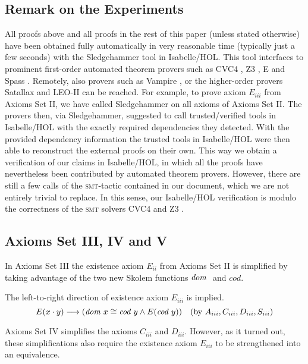 \subsection{Remark on the Experiments}
All proofs above and all proofs in the rest of this paper (unless
stated otherwise) have been obtained fully automatically in very
reasonable time (typically just a few seconds) with the
Sledgehammer tool in Isabelle/HOL. This tool interfaces to prominent
first-order automated theorem provers such as CVC4 \cite{CVC4}, Z3
\cite{Z3}, E \cite{E} and Spass \cite{Spass}.  Remotely, also
  provers such as Vampire \cite{Vampire}, or the higher-order provers
  Satallax \cite{Satallax} and LEO-II \cite{LEO} can be reached. For
  example, to prove axiom $E_{iii}$ from Axioms Set II, we have called
  Sledgehammer on all axioms of Axioms Set II. The provers then, via
  Sledgehammer, suggested to call trusted/verified tools in
  Isabelle/HOL with the exactly required dependencies they
  detected. With the provided dependency information the trusted tools
  in Isabelle/HOL were then able to reconstruct the external proofs on
  their own.  This way we obtain a verification of our claims in
  Isabelle/HOL, in which all the proofs have nevertheless been
  contributed by automated theorem provers. However, there are still
  a few calls of the \textsc{smt}-tactic contained in our document, 
   which we are not entirely trivial to replace. In this sense, our
   Isabelle/HOL verification is modulo the correctness of the \textsc{smt} solvers
   CVC4 \cite{CVC4} and Z3 \cite{Z3}.



\subsection{Axioms Set III, IV and V} 
In Axioms Set III the existence  axiom  $E_{ii}$ from Axioms Set II  is simplified by taking advantage of 
  the two new Skolem functions ${\textit{dom \/}}$ and $cod$.

The left-to-right direction of existence axiom $E_{iii}$ is implied.
  $$E(x \cdot y) \longrightarrow (\textit{dom \/} x \cong \textit{cod \/} y \wedge E(\textit{cod \/} y)) \quad  
    (\text{by } A_{iii}, C_{iii}, D_{iii}, S_{iii})$$


Axioms Set IV simplifies the axioms $C_{iii}$ and  $D_{iii}$. However, as it turned 
 out, these simplifications also require the existence axiom $E_{iii}$ to be strengthened into
 an equivalence.

